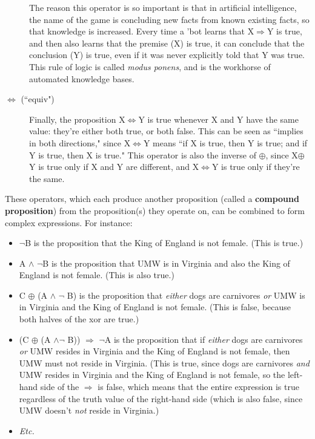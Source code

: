 \begin{description}
The reason this operator is so important is that in artificial
intelligence, the name of the game is concluding new facts from known
existing facts, so that knowledge is increased. Every time a 'bot learns
that X$\Rightarrow$Y is true, and then also learns that the premise (X) is
true, it can conclude that the conclusion (Y) is true, even if it was
never explicitly told that Y was true. This rule of logic is called
\textit{modus ponens}, and is the workhorse of automated knowledge bases.

\item[$\Leftrightarrow$ (``equiv")] Finally, the proposition
X$\Leftrightarrow$Y is true whenever X and Y have the same value: they're
either both true, or both false. This can be seen as ``implies in both
directions," since X$\Leftrightarrow$Y means ``if X is true, then Y is
true; and if Y is true, then X is true." This operator is also the inverse
of $\oplus$, since X$\oplus$Y is true only if X and Y are different, and
X$\Leftrightarrow$Y is true only if they're the same.

\end{description}

These operators, which each produce another proposition (called a
\textbf{compound proposition}) from the proposition(s) they operate on, can
be combined to form complex expressions. For instance:

\begin{itemize}
\item $\neg$B is the proposition that the King of England is not female.
(This is true.)
\item A $\wedge$ $\neg$B is the proposition that UMW is in Virginia and also
the King of England is not female. (This is also true.)
\item C $\oplus$ (A $\wedge$ $\neg$ B) is the proposition that \textit{either}
dogs are carnivores \textit{or} UMW is in Virginia and the King of England
is not female. (This is false, because both halves of the xor are true.)
\item (C $\oplus$ (A $\wedge \neg$ B)) $\Rightarrow$ $\neg$A is the
proposition that if \textit{either} dogs are carnivores \textit{or} UMW
resides in Virginia and the King of England is not female, then UMW must not
reside in Virginia. (This is true, since dogs are carnivores \textit{and}
UMW resides in Virginia and the King of England is not female, so the
left-hand side of the $\Rightarrow$ is false, which means that the entire
expression is true regardless of the truth value of the right-hand side
(which is also false, since UMW doesn't \textit{not} reside in Virginia.)
\item \textit{Etc.}

\end{itemize}


